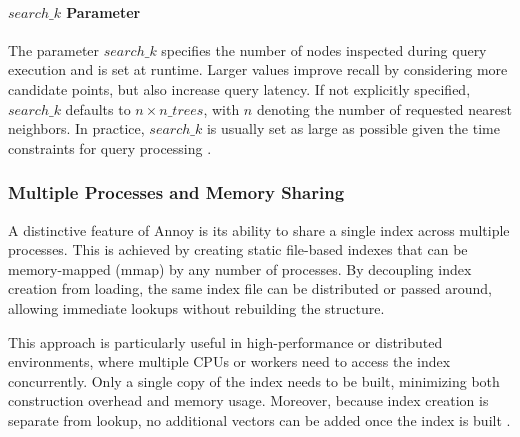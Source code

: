 \paragraph{$search\_k$ Parameter}

The parameter $search\_k$ specifies the number of nodes inspected during query execution and is set at runtime. Larger values improve recall by considering more candidate points, but also increase query latency. If not explicitly specified, $search\_k$ defaults to $n \times n\_trees$, with $n$ denoting the number of requested nearest neighbors. In practice, $search\_k$ is usually set as large as possible given the time constraints for query processing \cite{spotify-annoy}.

\subsubsection{Multiple Processes and Memory Sharing}

A distinctive feature of Annoy is its ability to share a single index across multiple processes. This is achieved by creating static file-based indexes that can be memory-mapped (mmap) by any number of processes. By decoupling index creation from loading, the same index file can be distributed or passed around, allowing immediate lookups without rebuilding the structure.

This approach is particularly useful in high-performance or distributed environments, where multiple CPUs or workers need to access the index concurrently. Only a single copy of the index needs to be built, minimizing both construction overhead and memory usage. Moreover, because index creation is separate from lookup, no additional vectors can be added once the index is built \cite{spotify-annoy}.